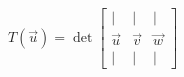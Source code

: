\documentclass[preview]{standalone}
\begin{document}
\begin{align*}
T(\vec{u}) = \det \begin{bmatrix} | & | & | \\ \vec{u} & \vec{v} & \vec{w} \\ | & | & | \end{bmatrix}
\end{align*}
\end{document}
